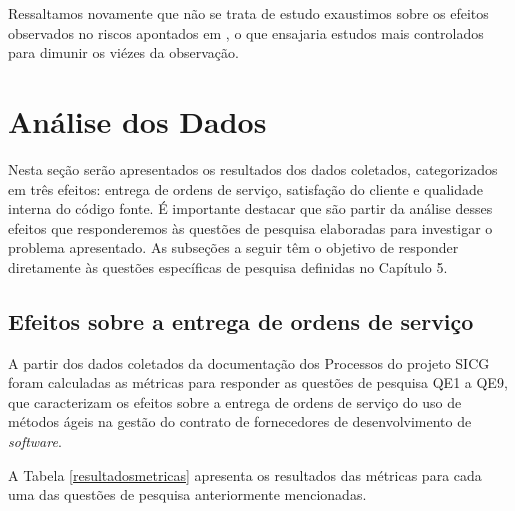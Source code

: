 Ressaltamos novamente que não se trata de estudo exaustimos sobre os efeitos observados no riscos apontados em , o que ensajaria estudos mais controlados para dimunir os viézes da observação.


\section[Análise dos Dados]{Análise dos Dados}

Nesta seção serão apresentados os resultados dos dados coletados, categorizados em três efeitos: entrega de ordens de serviço, satisfação do cliente e qualidade interna do código fonte. É importante destacar que são partir da análise desses efeitos que responderemos às questões de pesquisa elaboradas para investigar o problema apresentado. As subseções a seguir têm o objetivo de responder diretamente às questões específicas de pesquisa definidas no Capítulo 5.

\subsection[Efeitos sobre a entrega de ordens de serviço]{Efeitos sobre a entrega de ordens de serviço}

A partir dos dados coletados da documentação dos Processos do projeto SICG foram calculadas as métricas para responder as questões de pesquisa QE1 a QE9, que caracterizam os efeitos sobre a entrega de ordens de serviço do uso de métodos ágeis na gestão do contrato de fornecedores de desenvolvimento de \textit{software}.

A Tabela \ref{resultadosmetricas} apresenta os resultados das métricas para cada uma das questões de pesquisa anteriormente mencionadas.

